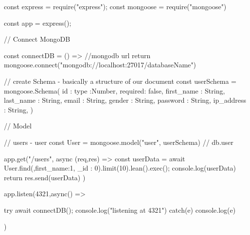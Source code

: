const express = require("express");
const mongoose = require("mongoose")

const app = express();

// Connect MongoDB

const connectDB = () => {
    //mongodb url
 return mongoose.connect("mongodb://localhost:27017/databaseName")
}

// create Schema - basically a structure of our document
const userSchema = mongoose.Schema({
    id : {type :Number, required: false},
    first_name : String,
    last_name : String,
    email : String,
    gender : String,
    password : String,
    ip_address : String,
})

// Model

// users - user
const User = mongoose.model("user", userSchema)
//  db.user


app.get("/users", async (req,res) => {
    const userData = await User.find({},{first_name:1, _id : 0}).limit(10).lean().exec();
    console.log(userData)
    return res.send(userData)
})




app.listen(4321,async() => {
    try{
        await connectDB();
        console.log("listening at 4321")
    }
    catch(e){
        console.log(e)
    }
       
})
